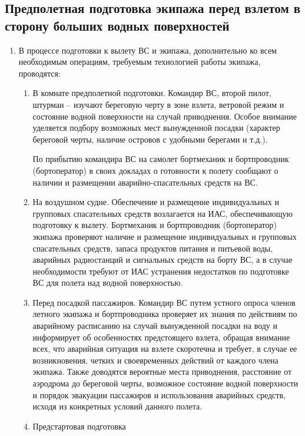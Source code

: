 \subsection{Предполетная подготовка экипажа перед взлетом в сторону больших водных поверхностей}

\begin{enumerate}
    \item В процессе подготовки к вылету ВС и экипажа, дополнительно ко всем необходимым операциям, требуемым технологией работы экипажа, проводятся:
    \begin{enumerate}
        \item В комнате предполетной подготовки. Командир ВС, второй пилот, штурман – изучают береговую черту в зоне взлета, ветровой режим и состояние водной поверхности на случай приводнения. Особое внимание уделяется подбору возможных мест вынужденной посадки (характер береговой черты, наличие островов с удобными берегами и т.д.).
        
        По прибытию командира ВС на самолет бортмеханик и бортпроводник (бортоператор) в своих докладах о готовности к полету сообщают о наличии и размещении аварийно-спасательных средств на ВС.
        \item На воздушном судне. Обеспечение и размещение индивидуальных и групповых спасательных средств возлагается на ИАС, обеспечивающую подготовку к вылету. Бортмеханик и бортпроводник (бортоператор) экипажа проверяют наличие и размещение индивидуальных и групповых спасательных средств, запаса продуктов питания и питьевой воды, аварийных радиостанций и сигнальных средств на борту ВС, а в случае необходимости требуют от ИАС устранения недостатков по подготовке ВС для полета над водной поверхностью.
        \item Перед посадкой пассажиров. Командир ВС путем устного опроса членов летного экипажа и бортпроводника проверяет их знания по действиям по аварийному расписанию на случай вынужденной посадки на воду и информирует об особенностях предстоящего взлета, обращая внимание всех, что аварийная ситуация на взлете скоротечна и требует, в случае ее возникновения, четких и своевременных действий от каждого члена экипажа. Также доводятся вероятные места приводнения, расстояние от аэродрома до береговой черты, возможное состояние водной поверхности и порядок эвакуации пассажиров и использования аварийных средств, исходя из конкретных условий данного полета.
        \item Предстартовая подготовка
        

\end{enumerate}
\end{enumerate}
